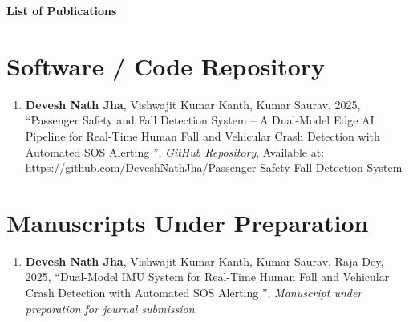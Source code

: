 \thispagestyle{empty}

\begin{center}
\Large {\bf List of Publications}
\end{center}

\section*{Software / Code Repository}
\begin{enumerate}
    \item \textbf{Devesh Nath Jha}, Vishwajit Kumar Kanth, Kumar Saurav, 2025, \textquotedblleft Passenger Safety and Fall Detection System -- A Dual-Model Edge AI Pipeline for Real-Time Human Fall and Vehicular Crash Detection with Automated SOS Alerting \textquotedblright, \textit{GitHub Repository}, Available at: \url{https://github.com/DeveshNathJha/Passenger-Safety-Fall-Detection-System}
\end{enumerate}

\section*{Manuscripts Under Preparation}
\begin{enumerate}
    \item \textbf{Devesh Nath Jha}, Vishwajit Kumar Kanth, Kumar Saurav, Raja Dey, 2025, \textquotedblleft Dual-Model IMU System for Real-Time Human Fall and Vehicular Crash Detection with Automated SOS Alerting \textquotedblright, \textit{Manuscript under preparation for journal submission}.
\end{enumerate}